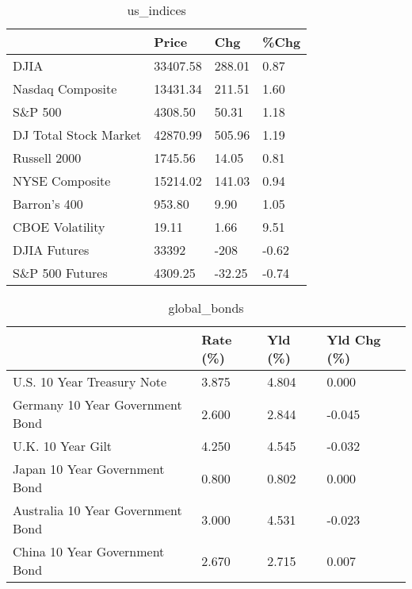 \documentclass{article}%
\begin{document}
%


\begin{table}[htbp]%
\caption{us\_indices}%
\centering%
\begin{adjustbox}{width=1\textwidth}%
\begin{tabular}{llll}
\toprule
                      &    Price &    Chg &  \%Chg \\
\midrule
                 DJIA & 33407.58 & 288.01 &  0.87 \\
     Nasdaq Composite & 13431.34 & 211.51 &  1.60 \\
              S\&P 500 &  4308.50 &  50.31 &  1.18 \\
DJ Total Stock Market & 42870.99 & 505.96 &  1.19 \\
         Russell 2000 &  1745.56 &  14.05 &  0.81 \\
       NYSE Composite & 15214.02 & 141.03 &  0.94 \\
         Barron's 400 &   953.80 &   9.90 &  1.05 \\
      CBOE Volatility &    19.11 &   1.66 &  9.51 \\
         DJIA Futures &    33392 &   -208 & -0.62 \\
      S\&P 500 Futures &  4309.25 & -32.25 & -0.74 \\
\bottomrule
\end{tabular}
%
\end{adjustbox}%
\end{table}

%


\begin{table}[htbp]%
\caption{global\_bonds}%
\centering%
\begin{adjustbox}{width=1\textwidth}%
\begin{tabular}{llll}
\toprule
                                  & Rate (\%) & Yld (\%) & Yld Chg (\%) \\
\midrule
       U.S. 10 Year Treasury Note &    3.875 &   4.804 &       0.000 \\
  Germany 10 Year Government Bond &    2.600 &   2.844 &      -0.045 \\
                U.K. 10 Year Gilt &    4.250 &   4.545 &      -0.032 \\
    Japan 10 Year Government Bond &    0.800 &   0.802 &       0.000 \\
Australia 10 Year Government Bond &    3.000 &   4.531 &      -0.023 \\
    China 10 Year Government Bond &    2.670 &   2.715 &       0.007 \\
\bottomrule
\end{tabular}
%
\end{adjustbox}%
\end{table}
\end{document}

